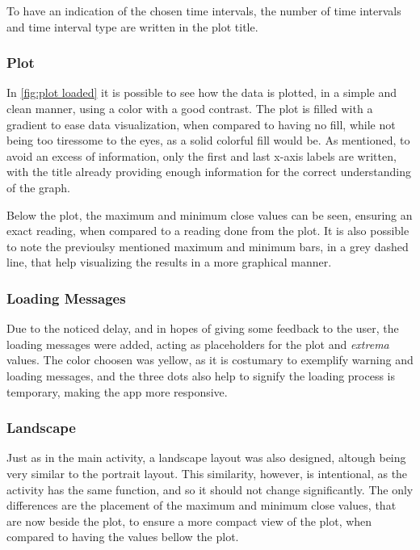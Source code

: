 \documentclass{article}
\begin{document}
To have an indication of the chosen time intervals, the number of time intervals and time interval type are written in the plot title.

\subsubsection{Plot}
In \autoref{fig:plot loaded} it is possible to see how the data is plotted, in a simple and clean manner, using a color with a good contrast.
The plot is filled with a gradient to ease data visualization, when compared to having no fill, while not being too tiressome to the eyes, as a solid colorful fill would be.
As mentioned, to avoid an excess of information, only the first and last x-axis labels are written, with the title already providing enough information for the correct understanding of the graph.

Below the plot, the maximum and minimum close values can be seen, ensuring an exact reading, when compared to a reading done from the plot.
It is also possible to note the previoulsy mentioned maximum and minimum bars, in a grey dashed line, that help visualizing the results in a more graphical manner.

\subsubsection{Loading Messages}
\label{sec:loading messages}
Due to the noticed delay, and in hopes of giving some feedback to the user, the loading messages were added, acting as placeholders for the plot and \textit{extrema} values.
The color choosen was yellow, as it is costumary to exemplify warning and loading messages, and the three dots also help to signify the loading process is temporary, making the app more responsive.

\subsubsection{Landscape}
Just as in the main activity, a landscape layout was also designed, altough being very similar to the portrait layout.
This similarity, however, is intentional, as the activity has the same function, and so it should not change significantly.
The only differences are the placement of the maximum and minimum close values, that are now beside the plot, to ensure a more compact view of the plot, when compared to having the values bellow the plot.
\end{document}
